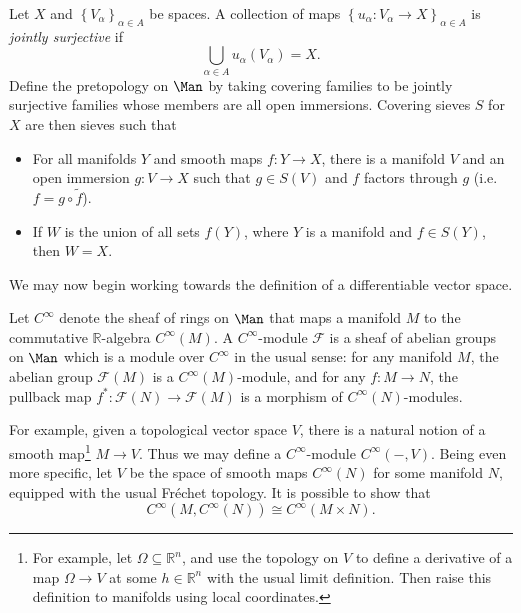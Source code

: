 \begin{definition}\label{dfn:3-5-5}
	Let $X$ and $\left\{ V_\alpha  \right\} _{\alpha \in A} $ be spaces. A collection of maps $\left\{ u_\alpha : V_\alpha  \to X \right\}_{\alpha \in A} $ is \emph{jointly surjective} if
	\[
		\bigcup_{\alpha \in A} u_\alpha (V_\alpha )=X
	.\]
	Define the pretopology on $\Man $ by taking covering families to be jointly surjective families whose members are all open immersions. Covering sieves $S$ for $X$ are then sieves such that
	\begin{itemize}
		\item For all manifolds $Y$ and smooth maps $f : Y \to X$, there is a manifold $V$ and an open immersion $g : V \to X$ such that $g\in S(V)$ and $f$ factors through $g$ (i.e. $f=g \circ \widetilde{f} $).
		\item If $W$ is the union of all sets $f(Y)$, where $Y$ is a manifold and $f\in S(Y)$, then $W=X$.
	\end{itemize}
\end{definition}

We may now begin working towards the definition of a differentiable vector space.

\begin{definition}\label{dfn:3-5-6}
	Let $C^\infty $ denote the sheaf of rings on $\Man$ that maps a manifold $M$ to the commutative $\mathbb{R} $-algebra $C^\infty (M)$. A $C^\infty $-module $\mathcal{F} $ is a sheaf of abelian groups on $\Man$ which is a module over $C^\infty $ in the usual sense: for any manifold $M$, the abelian group $\mathcal{F} (M)$ is a $C^\infty (M)$-module, and for any $f : M \to N$, the pullback map $f^* : \mathcal{F} (N) \to \mathcal{F} (M)$ is a morphism of $C^\infty (N)$-modules.
\end{definition}

For example, given a topological vector space $V$, there is a natural notion of a smooth map\footnote{For example, let $\Omega \subseteq \mathbb{R} ^n$, and use the topology on $V$ to define a derivative of a map $\Omega \to V$ at some $h\in\mathbb{R} ^n$ with the usual limit definition. Then raise this definition to manifolds using local coordinates.} $M\to V$. Thus we may define a $C^\infty $-module $C^\infty (-,V)$. Being even more specific, let $V$ be the space of smooth maps $C^\infty (N)$ for some manifold $N$, equipped with the usual Fr\'echet topology. It is possible to show that
\[
	C^\infty (M,C^\infty (N)) \cong C^\infty (M\times N)
.\]

